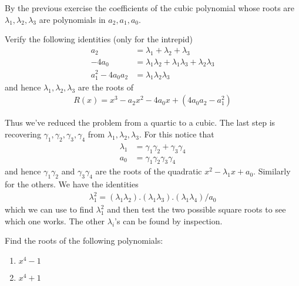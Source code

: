 \newpage
By the previous exercise the coefficients of the cubic polynomial whose roots are $ \lambda_1, \lambda_2, \lambda_3$ are polynomials in  $ a_2, a_1, a_0$.
\begin{questions}[resume]
  \item Verify the following identities (only for the intrepid)
    \begin{align*}
      a_2 &= \lambda_1 +\lambda_2 +\lambda_3\\
      -4 a_0 &= \lambda_1\lambda_2 +\lambda_1 \lambda_3 + \lambda_2 \lambda_3\\
      a_1^2 - 4a_0 a_2&=\lambda_1 \lambda_2 \lambda_3
    \end{align*}
    and hence $ \lambda_1, \lambda_2, \lambda_3$ are the roots of
    \begin{align*}
      R(x) = x^3 - a_2 x^2 - 4a_0x + (4a_0 a_2 - a_1^2)
    \end{align*}
\end{questions}

Thus we've reduced the problem from a quartic to a cubic. The last step is recovering $ \gamma_1, \gamma_2, \gamma_3, \gamma_4$ from $ \lambda_1, \lambda_2, \lambda_3$. For this notice that 
  \begin{align*}
    \lambda_1 &= \gamma_1 \gamma_2 + \gamma_3 \gamma_4 \\
    a_0 &= \gamma_1 \gamma_2 \gamma_3 \gamma_4
  \end{align*}
and hence $ \gamma_1 \gamma_2$ and $ \gamma_3 \gamma_4$ are the roots of the quadratic $x^2 - \lambda_1 x + a_0$. Similarly for the others.  We have the identities
  \begin{align*}
    \lambda_1^2 = (\lambda_1\lambda_2).(\lambda_1\lambda_3).(\lambda_1\lambda_4)/a_0
  \end{align*}
which we can use to find $ \lambda_1^2$ and then test the two possible square roots to see which one works. The other $ \lambda_i$'s can be found by inspection.

\begin{questions}[resume]
  \item Find the roots of the following polynomials:
    \begin{enumerate}
      \item $x^4 - 1$
      \item $x^4 + 1$
    \end{enumerate}
\end{questions}


